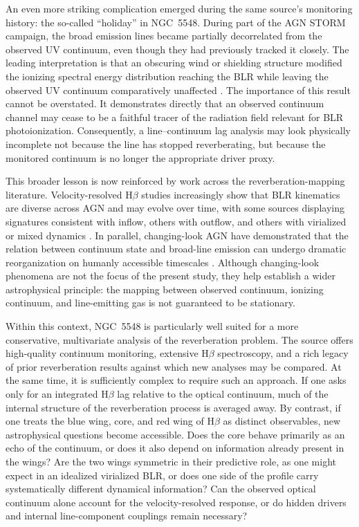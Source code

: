 \documentclass[fleqn,usenatbib]{mnras}
\begin{document}
An even more striking complication emerged during the same source's monitoring history: the so-called ``holiday'' in NGC~5548. During part of the AGN STORM campaign, the broad emission lines became partially decorrelated from the observed UV continuum, even though they had previously tracked it closely. The leading interpretation is that an obscuring wind or shielding structure modified the ionizing spectral energy distribution reaching the BLR while leaving the observed UV continuum comparatively unaffected \cite{Dehghanian2019}. The importance of this result cannot be overstated. It demonstrates directly that an observed continuum channel may cease to be a faithful tracer of the radiation field relevant for BLR photoionization. Consequently, a line--continuum lag analysis may look physically incomplete not because the line has stopped reverberating, but because the monitored continuum is no longer the appropriate driver proxy.

This broader lesson is now reinforced by work across the reverberation-mapping literature. Velocity-resolved H$\beta$ studies increasingly show that BLR kinematics are diverse across AGN and may evolve over time, with some sources displaying signatures consistent with inflow, others with outflow, and others with virialized or mixed dynamics \cite{Du2018,Wang2025,Feng2024}. In parallel, changing-look AGN have demonstrated that the relation between continuum state and broad-line emission can undergo dramatic reorganization on humanly accessible timescales \cite{RicciTrakhtenbrot2023}. Although changing-look phenomena are not the focus of the present study, they help establish a wider astrophysical principle: the mapping between observed continuum, ionizing continuum, and line-emitting gas is not guaranteed to be stationary.

Within this context, NGC~5548 is particularly well suited for a more conservative, multivariate analysis of the reverberation problem. The source offers high-quality continuum monitoring, extensive H$\beta$ spectroscopy, and a rich legacy of prior reverberation results against which new analyses may be compared. At the same time, it is sufficiently complex to require such an approach. If one asks only for an integrated H$\beta$ lag relative to the optical continuum, much of the internal structure of the reverberation process is averaged away. By contrast, if one treats the blue wing, core, and red wing of H$\beta$ as distinct observables, new astrophysical questions become accessible. Does the core behave primarily as an echo of the continuum, or does it also depend on information already present in the wings? Are the two wings symmetric in their predictive role, as one might expect in an idealized virialized BLR, or does one side of the profile carry systematically different dynamical information? Can the observed optical continuum alone account for the velocity-resolved response, or do hidden drivers and internal line-component couplings remain necessary?
\end{document}

